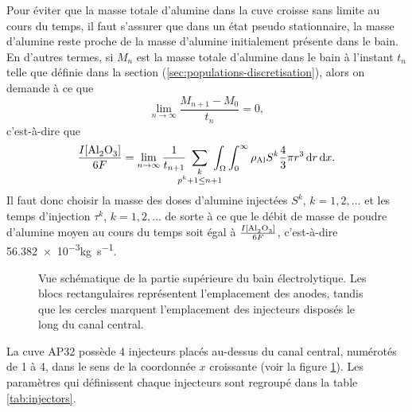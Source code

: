 Pour éviter que la masse totale d'alumine dans la cuve croisse sans
limite au cours du temps, il faut s'assurer que dans un état pseudo
stationnaire, la masse d'alumine reste proche de la masse d'alumine
initialement présente dans le bain. En d'autres termes, si $M_n$ est
la masse totale d'alumine dans le bain à l'instant $t_n$ telle que
définie dans la section (\ref{sec:populations-discretisation}), alors
on demande à ce que
\begin{equation*}
\lim_{n\to\infty} \frac{M_{n+1} - M_{0}}{t_n} = 0,
\end{equation*}
c'est-à-dire que
\begin{equation}\label{eq:injection-mass-condition}
  \frac{I[\cee{Al2O3}]}{6F}
  =\lim_{n\to \infty}\frac{1}{t_{n+1}}\ \sum_{\mathclap{\substack{k\\ p^k + 1\leq n +
        1}}}\ \int_\Omega\int_0^\infty\aluminadensity S^k \frac{4}{3}\pi r^3\intd{r}\intd{x}.
\end{equation}
Il faut donc choisir la masse des doses d'alumine injectées $S^k$, $k
= 1, 2,\dots$ et les temps d'injection $\tau^k$, $k = 1,2,\dots$ de
sorte à ce que le débit de masse de poudre d'alumine moyen au cours du
temps soit égal à $\frac{I[\cee{Al2O3}]}{6F}$, c'est-à-dire
\num{56.382e-3}\si{\kilo\gram\per\second}.

\begin{figure}
  \begin{center}
    
    \caption{Vue schématique de la partie supérieure du bain
      électrolytique. Les blocs rectangulaires représentent
      l'emplacement des anodes, tandis que les cercles marquent
      l'emplacement des injecteurs disposés le long du canal central.}
    \label{fig:anode-configuration}
  \end{center}
\end{figure}

La cuve AP32 possède 4 injecteurs placés au-dessus du canal central,
numérotés de 1 à 4, dans le sens de la coordonnée $x$ croissante (voir
la figure \ref{fig:anode-configuration}). Les paramètres qui
définissent chaque injecteurs sont regroupé dans la table
\ref{tab:injectors}.

